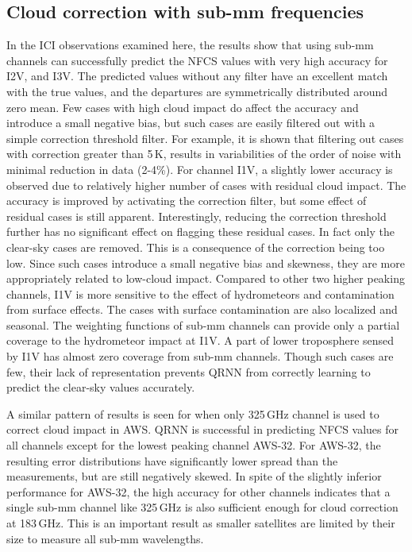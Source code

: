 \documentclass[amt, manuscript]{copernicus}
\begin{document}
\subsection{Cloud correction with sub-mm frequencies }
%
In the ICI observations examined here, the results show that using sub-mm channels can successfully predict the NFCS values with very high accuracy for I2V, and I3V. The predicted values without any filter have an excellent match with the true values, and the departures are symmetrically distributed around zero mean. Few cases with high cloud impact do affect the accuracy and introduce a small negative bias, but such cases are easily filtered out with a simple correction threshold filter. For example, it is shown that filtering out cases with correction greater than 5\,K, results in variabilities of the order of noise with minimal reduction in data (2-4\%). For channel I1V, a slightly lower accuracy is observed due to relatively higher number of cases with residual cloud impact. The accuracy is improved by activating the correction filter, but some effect of residual cases is still apparent. Interestingly, reducing the correction threshold further has no significant effect on flagging these residual cases. In fact only the clear-sky cases are removed. This is a consequence of the correction being too low. Since such cases introduce a small negative bias and skewness, they are more appropriately related to low-cloud impact. Compared to other two higher peaking channels, I1V is more sensitive to the effect of hydrometeors  and contamination from surface effects. The cases with surface contamination are also localized and seasonal. The weighting functions of sub-mm channels can provide only a partial coverage to the hydrometeor impact at I1V. A part of lower troposphere sensed by I1V has almost zero coverage from sub-mm channels. Though such cases are few, their lack of representation prevents QRNN from correctly learning to predict the clear-sky values accurately.

A similar pattern of results is seen for when only 325\,GHz channel is used to correct cloud impact in AWS. QRNN is successful in predicting NFCS values for all channels except for the lowest peaking channel AWS-32. For AWS-32, the resulting error distributions have significantly lower spread than the measurements, but are still negatively skewed. In spite of the slightly inferior performance for AWS-32, the high accuracy for other channels indicates that a single sub-mm channel like 325\,GHz is also sufficient enough for cloud correction at 183\,GHz. This is an important result as smaller satellites are limited by their size to measure all sub-mm wavelengths.
\end{document}
